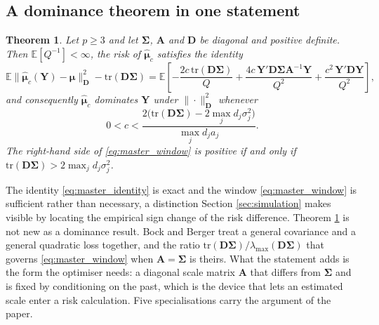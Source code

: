 \documentclass[pdflatex,sn-mathphys-num]{sn-jnl}%
\theoremstyle{thmstyleone}%
\newtheorem{theorem}{Theorem}%
\theoremstyle{thmstyletwo}%
\theoremstyle{thmstylethree}%
\newcommand{\rev}[1]{#1}
\newcommand{\tr}{\mathrm{tr}}
\newcommand{\E}{\mathbb{E}}
\begin{document}
\subsection{A dominance theorem in one statement}

\begin{theorem}
\label{thm:master}
Let $p\ge3$ and let $\bm\Sigma$, $\bm A$ and $\bm D$ be diagonal and positive definite. Then $\E[Q^{-1}]<\infty$, the risk of $\hat{\bm\mu}_c$ satisfies the identity
\begin{equation}
\label{eq:master_identity}
\E\bigl\|\hat{\bm\mu}_c(\bm Y)-\bm\mu\bigr\|^2_{\bm D}
-\tr(\bm D\bm\Sigma)
=
\E\left[
-\frac{2c\,\tr(\bm D\bm\Sigma)}{Q}
+\frac{4c\,\bm Y'\bm D\bm\Sigma\bm A^{-1}\bm Y}{Q^{2}}
+\frac{c^{2}\,\bm Y'\bm D\bm Y}{Q^{2}}
\right],
\end{equation}
and consequently $\hat{\bm\mu}_c$ dominates $\bm Y$ under $\|\cdot\|^2_{\bm D}$ whenever
\begin{equation}
\label{eq:master_window}
0<c<\frac{2\bigl(\tr(\bm D\bm\Sigma)-2\max_{j}d_j\sigma^2_j\bigr)}{\max_{j}d_ja_j} .
\end{equation}
The right-hand side of \eqref{eq:master_window} is positive if and only if $\tr(\bm D\bm\Sigma)>2\max_{j}d_j\sigma^2_j$.
\end{theorem}

The identity \eqref{eq:master_identity} is exact and the window \eqref{eq:master_window} is sufficient rather than necessary, a distinction Section \ref{sec:simulation} makes visible by locating the empirical sign change of the risk difference. \rev{Theorem \ref{thm:master} is not new as a dominance result. Bock \cite{bock1975} and Berger \cite{berger1976jmva} treat a general covariance and a general quadratic loss together, and the ratio $\tr(\bm D\bm\Sigma)/\lambda_{\max}(\bm D\bm\Sigma)$ that governs \eqref{eq:master_window} when $\bm A=\bm\Sigma$ is theirs. What the statement adds is the form the optimiser needs: a diagonal scale matrix $\bm A$ that differs from $\bm\Sigma$ and is fixed by conditioning on the past, which is the device that lets an estimated scale enter a risk calculation.} \rev{Five} specialisations carry the argument of the paper.
\end{document}
